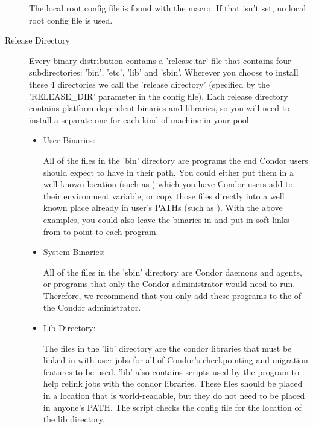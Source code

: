 \begin{description}
The local root config file is found with the
 macro.  If that isn't set, no local
root config file is used.

\item[Release Directory]

Every binary distribution contains a 'release.tar' file that contains
four subdirectories: 'bin', 'etc', 'lib' and 'sbin'.  Wherever you
choose to install these 4 directories we call the 'release directory'
(specified by the 'RELEASE\_DIR' parameter in the config file).  Each
release directory contains platform dependent binaries and libraries,
so you will need to install a separate one for each kind of machine in
your pool.

\begin{itemize}
     \item User Binaries:

     All of the files in the 'bin' directory are programs the end
     Condor users should expect to have in their path.  You could
     either put them in a well known location (such as
     ) which you have Condor users add to
     their  environment variable, or copy those files
     directly into a well known place already in user's PATHs (such as
     ).  With the above examples, you could also
     leave the binaries in  and put in
     soft links from  to point to each program.

     \item System Binaries:

     All of the files in the 'sbin' directory are Condor daemons and
     agents, or programs that only the Condor administrator would need
     to run.  Therefore, we recommend that you only add these programs
     to the  of the Condor administrator.

     \item Lib Directory:

     The files in the 'lib' directory are the condor libraries that
     must be linked in with user jobs for all of Condor's
     checkpointing and migration features to be used.  'lib' also
     contains scripts used by the  program to help
     relink jobs with the condor libraries.  These files should be
     placed in a location that is world-readable, but they do not need
     to be placed in anyone's PATH.  The  script checks
     the config file for the location of the lib directory.


\end{itemize}
\end{description}
